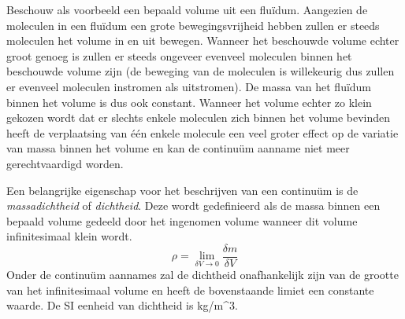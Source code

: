 Beschouw als voorbeeld een bepaald volume uit een fluïdum. Aangezien de moleculen in een fluïdum een grote bewegingsvrijheid hebben zullen er steeds moleculen het volume in en uit bewegen. Wanneer het beschouwde volume echter groot genoeg is zullen er steeds ongeveer evenveel moleculen binnen het beschouwde volume zijn (de beweging van de moleculen is willekeurig dus zullen er evenveel moleculen instromen als uitstromen). De massa van het fluïdum binnen het volume is dus ook constant. Wanneer het volume echter zo klein gekozen wordt dat er slechts enkele moleculen zich binnen het volume bevinden heeft de verplaatsing van één enkele molecule een veel groter effect op de variatie van massa binnen het volume en kan de continuüm aanname niet meer gerechtvaardigd worden.

Een belangrijke eigenschap voor het beschrijven van een continuüm is de \emph{massadichtheid} of \emph{dichtheid}. Deze wordt gedefinieerd als de massa binnen een bepaald volume gedeeld door het ingenomen volume wanneer dit volume infinitesimaal klein wordt. 
\begin{equation}
	\rho = \lim_{\delta V \to 0} \frac{\delta m}{\delta V}
	\label{eqn:dichtheid}
\end{equation}
Onder de continuüm aannames zal de dichtheid onafhankelijk zijn van de grootte van het infinitesimaal volume en heeft de bovenstaande limiet een constante waarde. De SI eenheid van dichtheid is \unit{}{kg/m^3}.

